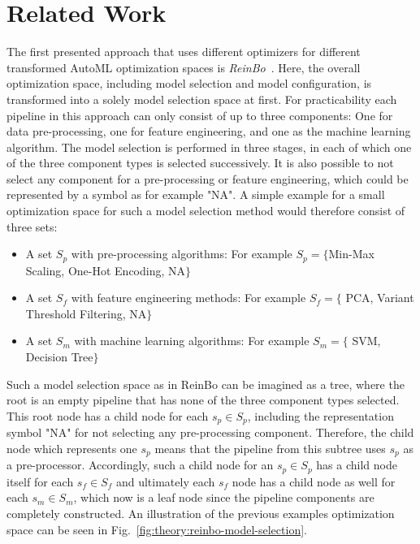 \section{Related Work}
\label{sec:theory:related}
The first presented approach that uses different optimizers for different transformed AutoML optimization spaces is \textit{ReinBo}~\cite{Sun-ReinBo}.
Here, the overall optimization space, including model selection and model configuration, is transformed into a solely model selection space at first.
For practicability each pipeline in this approach can only consist of up to three components: One for data pre-processing, one for feature engineering, and one as the machine learning algorithm.
The model selection is performed in three stages, in each of which one of the three component types is selected successively.
It is also possible to not select any component for a pre-processing or feature engineering, which could be represented by a symbol as for example "NA".
A simple example for a small optimization space for such a model selection method would therefore consist of three sets:
\begin{itemize}
    \item A set $S_p$ with pre-processing algorithms: For example $S_p=\{$Min-Max Scaling, One-Hot Encoding, NA$\}$
    \item A set $S_f$ with feature engineering methods: For example $S_f=\{$ PCA, Variant Threshold Filtering, NA$\}$
    \item A set $S_m$ with machine learning algorithms: For example $S_m=\{$ SVM, Decision Tree$\}$
\end{itemize}
Such a model selection space as in ReinBo can be imagined as a tree, where the root is an empty pipeline that has none of the three component types selected.
This root node has a child node for each $s_p \in S_p$, including the representation symbol "NA" for not selecting any pre-processing component.
Therefore, the child node which represents one $s_p$ means that the pipeline from this subtree uses $s_p$ as a pre-processor.
Accordingly, such a child node for an $s_p \in S_p$ has a child node itself for each $s_f \in S_f$ and ultimately each $s_f$ node has a child node as well for each $s_m \in S_m$, which now is a leaf node since the pipeline components are completely constructed.
An illustration of the previous examples optimization space can be seen in Fig.~\ref{fig:theory:reinbo-model-selection}.
